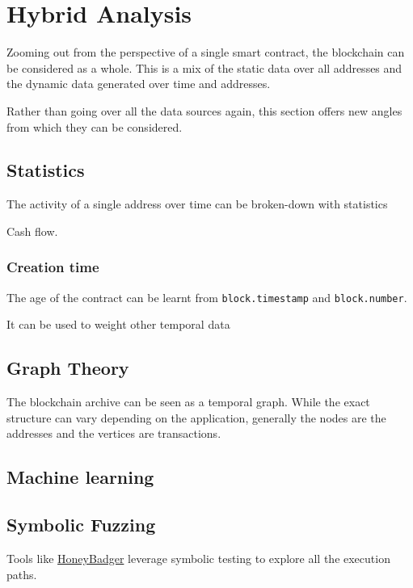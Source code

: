 \section{Hybrid Analysis} \label{sec:data-hybrid}

Zooming out from the perspective of a single smart contract, the blockchain can be considered as a whole.
This is a mix of the static data over all addresses and the dynamic data generated over time and addresses.

Rather than going over all the data sources again, this section offers new angles from which they can be considered.

\subsection{Statistics}

The activity of a single address over time can be broken-down with statistics

Cash flow.

\subsubsection{Creation time}

The age of the contract can be learnt from \lstinline[language=Solidity]{block.timestamp} and \lstinline[language=Solidity]{block.number}.

It can be used to weight other temporal data

\subsection{Graph Theory} \label{sec:hybrid-graph}

The blockchain archive can be seen as a temporal graph.
While the exact structure can vary depending on the application, generally the nodes are the addresses and the vertices are transactions.

\subsection{Machine learning}

\subsection{Symbolic Fuzzing}

Tools like \href{\urlcodehoneybadger}{HoneyBadger} leverage symbolic testing to explore all the execution paths.

